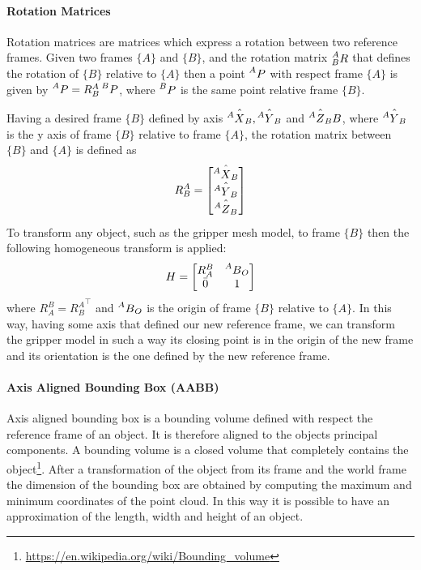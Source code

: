 \paragraph{Rotation Matrices}
Rotation matrices are matrices which express a rotation between two reference frames. Given two frames $\{A\}$ and $\{B\}$, and the rotation matrix $\prescript{A}{B}R$ that defines the rotation of $\{B\}$ relative to $\{A\}$ then a point $\prescript{A}{}P$ with respect frame $\{A\}$ is given by $\prescript{A}{}P=R^{A}_{B}\prescript{B}{}P$, where $\prescript{B}{}P$ is the same point relative frame $\{B\}$. 

Having a desired frame $\{B\}$ defined by axis $\hat{\prescript{A}{}X_B},\hat{\prescript{A}{}Y_B}$ and $\hat{\prescript{A}{}Z_B}B$, where $\hat{\prescript{A}{}Y_B}$ is the y axis of frame $\{B\}$ relative to frame $\{A\}$, the rotation matrix between $\{B\}$ and $\{A\}$ is defined as
\[
R^{A}_{B} = 
\begin{bmatrix}
\hat{\prescript{A}{}X_B} \\
\hat{\prescript{A}{}Y_B} \\
\hat{\prescript{A}{}Z_B} \\
\end{bmatrix}
\]
To transform any object, such as the gripper mesh model, to frame $\{B\}$ then the following homogeneous transform is applied:
\[
H = 
\begin{bmatrix}
R^{B}_{A} & \prescript{A}{}B_O \\
\bar{0} & 1
\end{bmatrix}
\]
where  $R^{B}_{A}={R^{A}_{B}}^{\top}$ and $\prescript{A}{}B_O$ is the origin of frame $\{B\}$ relative to $\{A\}$. In this way, having some axis that defined our new reference frame, we can transform the gripper model in such a way its closing point is in the origin of the new frame and its orientation is the one defined by the new reference frame. 

\paragraph{Axis Aligned Bounding Box (AABB)}
Axis aligned bounding box is a bounding volume defined with respect the reference frame of an object. It is therefore aligned to the objects principal components. A bounding volume is a closed volume that completely contains the object\footnote{\href{https://en.wikipedia.org/wiki/Bounding_volume}{\url{https://en.wikipedia.org/wiki/Bounding\_volume}}}.
After a transformation of the object from its frame and the world frame the dimension of the bounding box are obtained by computing the maximum and minimum coordinates of the point cloud. In this way it is possible to have an approximation of the length, width and height of an object. 

